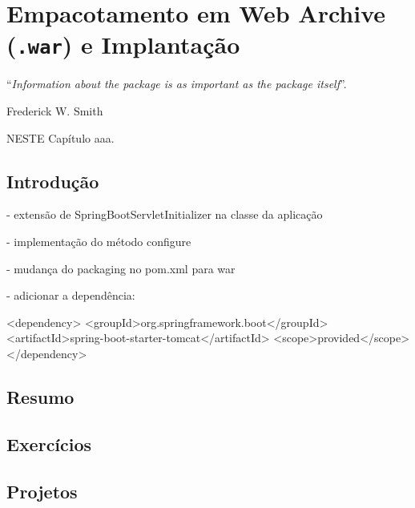 \chapter{Empacotamento em Web Archive (\texttt{.war}) e Implantação}\label{cap:empacotamento}
\epigraph{``\textit{Information about the package is as important as the package itself}''.}{Frederick W. Smith}

\lettrine[lines=4, lhang=0.1, lraise=0, loversize=0.2, findent=0.1em]{\textcolor{corTema}{N}}{ESTE} Capítulo aaa.

\vfill

\section{Introdução}

- extensão de SpringBootServletInitializer na classe da aplicação

- implementação do método configure

- mudança do packaging no pom.xml para war

- adicionar a dependência:

<dependency>
    <groupId>org.springframework.boot</groupId>
    <artifactId>spring-boot-starter-tomcat</artifactId>
    <scope>provided</scope>
</dependency>

\section{Resumo}

\section{Exercícios}

\section{Projetos}
